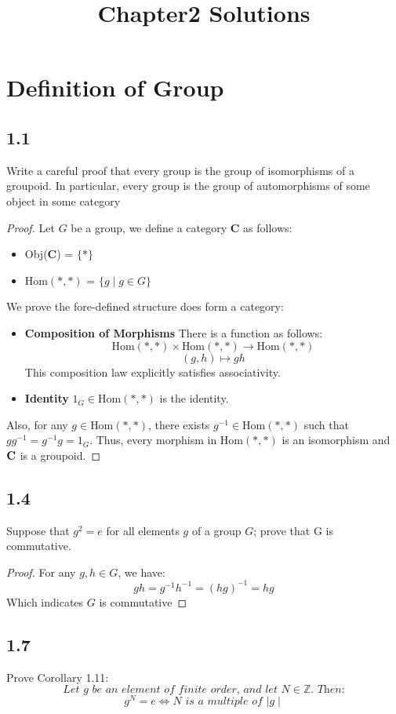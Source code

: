 \documentclass[a4paper, 12pt]{article}
\title{Chapter2 Solutions}
\newcommand{\catname}[1]{{\normalfont\textbf{#1}}}
\begin{document}
  \section*{Definition of Group}
  \subsection*{1.1} Write a careful proof that every group is the group of isomorphisms of a
groupoid. In particular, every group is the group of automorphisms of some object
in some category
\begin{proof}
  Let $G$ be a group, we define a category \catname{C} as follows:
  \begin{itemize}
    \item Obj(\catname{C}) = $\{*\}$
    \item Hom$(*,*)$ = $\{g \mid g \in G\}$
  \end{itemize}
  We prove the fore-defined structure does form a category:
  \begin{itemize}
    \item \textbf{Composition of Morphisms}\quad  
    There is a function as follows:\\
    $$
    \mbox{Hom}(*,*) \times \mbox{Hom}(*,*) \rightarrow \mbox{Hom}(*,*)
    $$
    $$
    (g,h)\mapsto gh
    $$
    This composition law explicitly satisfies associativity.
    
    \item \textbf{Identity} $1_G\in \mbox{Hom}(*,*)$ is the identity.
  \end{itemize}
  Also, for any $g\in \mbox{Hom}(*,*)$, there exists $g^{-1}\in \mbox{Hom}(*,*)$ such that
  $gg^{-1} = g^{-1}g = 1_G$. Thus, every morphism in $\mbox{Hom}(*,*)$ is an isomorphism and 
  $\catname{C}$ is a groupoid.
\end{proof}

\subsection*{1.4} Suppose that $g^2 = e$ for all elements $g$ of a group $G$; prove that G is commutative.
\begin{proof}
  For any $g,h\in G$, we have:
  $$
  gh = g^{-1}h^{-1} = (hg)^{-1} = hg 
  $$
  Which indicates $G$ is commutative
\end{proof}

\subsection*{1.7} Prove Corollary 1.11: \\
$$
\textit{Let $g$ be an element of finite order, and let $N\in\mathbb{Z}$. Then:}
$$
$$
\textit{$g^{N}=e\Leftrightarrow N$ is a multiple of $\mid g\mid$}
$$
\end{document}
